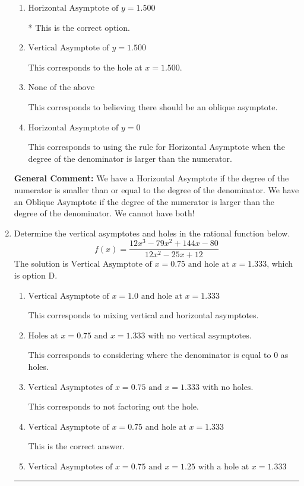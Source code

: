 \documentclass{extbook}[14pt]
\newcommand{\litem}[1]{\item #1

\rule{\textwidth}{0.4pt}}
\begin{document}
\begin{enumerate}
{\begin{enumerate}[label=\Alph*.]
This corresponds to the hole at $x = 4$.
\item \( \text{Horizontal Asymptote of } y = 1.500  \)

* This is the correct option.
\item \( \text{Vertical Asymptote of } y = 1.500  \)

This corresponds to the hole at $x = 1.500$.
\item \( \text{None of the above} \)

This corresponds to believing there should be an oblique asymptote.
\item \( \text{Horizontal Asymptote of } y = 0  \)

This corresponds to using the rule for Horizontal Asymptote when the degree of the denominator is larger than the numerator.
\end{enumerate}

\textbf{General Comment:} We have a Horizontal Asymptote if the degree of the numerator is smaller than or equal to the degree of the denominator. We have an Oblique Asymptote if the degree of the numerator is larger than the degree of the denominator. We cannot have both!
}
\litem{
Determine the vertical asymptotes and holes in the rational function below.
\[ f(x) = \frac{12x^{3} -79 x^{2} +144 x -80}{12x^{2} -25 x + 12} \]The solution is \( \text{Vertical Asymptote of } x = 0.75 \text{ and hole at } x = 1.333 \), which is option D.\begin{enumerate}[label=\Alph*.]
\item \( \text{Vertical Asymptote of } x = 1.0 \text{ and hole at } x = 1.333 \)

This corresponds to mixing vertical and horizontal asymptotes.
\item \( \text{Holes at } x = 0.75 \text{ and } x = 1.333 \text{ with no vertical asymptotes.} \)

This corresponds to considering where the denominator is equal to 0 as holes.
\item \( \text{Vertical Asymptotes of } x = 0.75 \text{ and } x = 1.333 \text{ with no holes.} \)

This corresponds to not factoring out the hole.
\item \( \text{Vertical Asymptote of } x = 0.75 \text{ and hole at } x = 1.333 \)

This is the correct answer.
\item \( \text{Vertical Asymptotes of } x = 0.75 \text{ and } x = 1.25 \text{ with a hole at } x = 1.333 \)


\end{enumerate}}
\end{enumerate}
\end{document}
